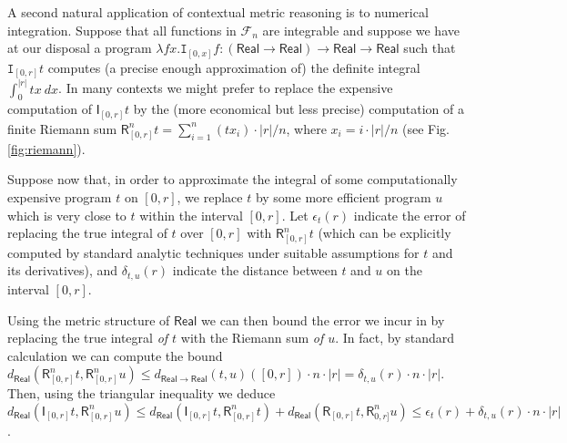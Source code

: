 \begin{example}
A second natural application of contextual metric reasoning is to numerical integration. Suppose that all functions in $\mathcal F_{n}$ are integrable and suppose we have at our disposal a program $\lambda fx.\mathtt I_{[0,x]}f: (\mathsf{Real}\to \mathsf{Real})\to \mathsf{Real}\to \mathsf{Real}$ such that $\mathtt I_{[0,r]}t$ computes (a precise enough approximation of) the definite integral $\int_{0}^{|r|}tx \ dx$.
In many contexts we might prefer to replace the expensive computation of $\mathsf I_{[0,r]}t$ by the (more economical but less precise) computation of a finite Riemann sum $\mathsf R^{n}_{[0,r]}t=  \sum_{i=1}^{n}(tx_{i})\cdot |r|/n$, where 
 $x_{i}=  i\cdot |r|/n$ (see Fig. \ref{fig:riemann}).  

%
%


Suppose now that, in order to approximate the integral of some computationally expensive program $t$ on $[0,r]$, we replace $t$ by some more efficient program $u$ which is very close to $t$ within the interval $[0,r]$.
Let $\epsilon_{t}(r)$ indicate the error of replacing the true integral of $t$ over $[0,r]$ with $\mathsf{R}^{n}_{[0,r]}t$ (which can be explicitly computed by standard analytic techniques under suitable assumptions for $t$ and its derivatives),
 and 
$\delta_{t,u}(r)$ indicate the distance between $t$ and $u$ on the interval $[0,r]$.

Using the metric structure of $\mathsf{Real}$ we can then bound the error we incur in by replacing the true integral \emph{of $t$} with the Riemann sum \emph{of $u$}. 
In fact, by standard calculation we can compute the bound
$d_{\mathsf{Real}} ( \mathsf{R}^{n}_{[0,r]}t, \mathsf R^{n}_{[0,r]}u)\leq 
d_{\mathsf{Real}\to\mathsf{Real}}(t, u)([0,r]) \cdot n \cdot |r|= \delta_{t,u}(r)\cdot n \cdot |r|$.
Then, using the triangular inequality we deduce
$d_{\mathsf{Real}} ( \mathsf{I}_{[0,r]}t, \mathsf R^{n}_{[0,r]}u)
\leq
d_{\mathsf{Real}} ( \mathsf{I}_{[0,r]}t, \mathsf R^{n}_{[0,r]}t) +
d_{\mathsf{Real}} ( \mathsf{R}_{[0,r]}t,\mathsf R^{n}_{0,r]}u) \leq 
\epsilon_{t}(r)
+ 
\delta_{t,u}(r)\cdot 
 n\cdot |r|$.
 

\end{example}
